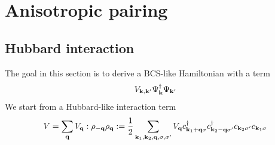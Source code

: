 \section{Anisotropic pairing}

\subsection{Hubbard interaction}

The goal in this section is to derive a BCS-like Hamiltonian with a term
\begin{equation}
    V_{\mathbf{k}, \mathbf{k}^{\prime}} \Psi^{\dagger}_{\mathbf{k}} \Psi_{\mathbf{k}^{\prime}}
\end{equation}
We start from a Hubbard-like interaction term
\begin{equation}
    V = \sum_{\mathbf{q}} V_{\mathbf{q}} : \rho_{-\mathbf{q}} \rho_{\mathbf{q}} : = \frac{1}{2} \sum_{\mathbf{k}_1, \mathbf{k}_2, \mathbf{q}, \sigma, \sigma^{\prime}} V_{\mathbf{q}} c_{\mathbf{k}_1 + \mathbf{q} \sigma}^{\dagger} c_{\mathbf{k}_2 - \mathbf{q} \sigma^{\prime}}^{\dagger} c_{\mathbf{k}_2 \sigma^{\prime}} c_{\mathbf{k}_1 \sigma}
\end{equation}

